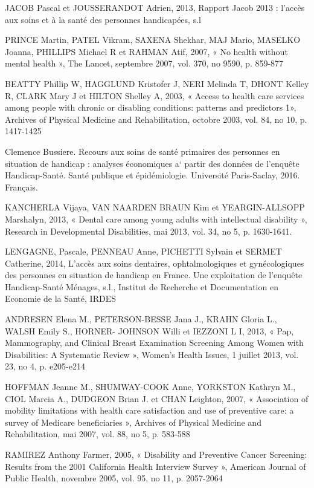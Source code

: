 JACOB Pascal et JOUSSERANDOT Adrien, 2013, Rapport Jacob 2013 : l’accès aux soins et à la santé des personnes handicapées, s.l

PRINCE Martin, PATEL Vikram, SAXENA Shekhar, MAJ Mario, MASELKO Joanna, PHILLIPS Michael R et RAHMAN Atif, 2007, « No health without mental health », The Lancet, septembre 2007, vol. 370, no 9590, p. 859-877

BEATTY Phillip W, HAGGLUND Kristofer J, NERI Melinda T, DHONT Kelley R, CLARK Mary J et HILTON Shelley A, 2003, « Access to health care services among people with chronic or disabling conditions: patterns and predictors 1», Archives of Physical Medicine and Rehabilitation, octobre 2003, vol. 84, no 10, p. 1417-1425


Clemence Bussiere. Recours aux soins de santé primaires des personnes en situation de handicap : analyses économiques a` partir des données de l’enquête Handicap-Santé. Santé publique et épidémiologie. Université Paris-Saclay, 2016. Français.


KANCHERLA Vijaya, VAN NAARDEN BRAUN Kim et YEARGIN-ALLSOPP Marshalyn, 2013, « Dental care among young adults with intellectual disability », Research in Developmental Disabilities, mai 2013, vol. 34, no 5, p. 1630-1641.

LENGAGNE, Pascale, PENNEAU Anne, PICHETTI Sylvain et SERMET Catherine, 2014, L’accès aux soins dentaires, ophtalmologiques et gynécologiques des personnes en situation de handicap en France. Une exploitation de l’enquête Handicap-Santé Ménages, s.l., Institut de Recherche et Documentation en Economie de la Santé, IRDES

ANDRESEN Elena M., PETERSON-BESSE Jana J., KRAHN Gloria L., WALSH Emily S., HORNER- JOHNSON Willi et IEZZONI L I, 2013, « Pap, Mammography, and Clinical Breast Examination Screening Among Women with Disabilities: A Systematic Review », Women’s Health Issues, 1 juillet 2013, vol. 23, no 4, p. e205-e214

HOFFMAN Jeanne M., SHUMWAY-COOK Anne, YORKSTON Kathryn M., CIOL Marcia A., DUDGEON Brian J. et CHAN Leighton, 2007, « Association of mobility limitations with health care satisfaction and use of preventive care: a survey of Medicare beneficiaries », Archives of Physical Medicine and Rehabilitation, mai 2007, vol. 88, no 5, p. 583‐588

RAMIREZ Anthony Farmer, 2005, « Disability and Preventive Cancer Screening: Results from the 2001 California Health Interview Survey », American Journal of Public Health, novembre 2005, vol. 95, no 11, p. 2057-2064

